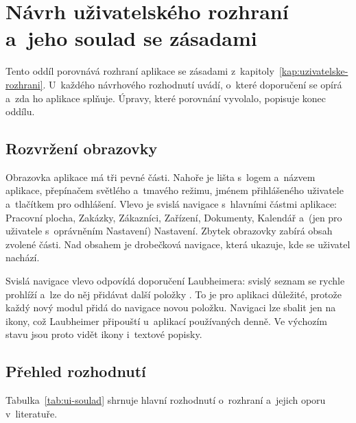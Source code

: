 \section{Návrh uživatelského rozhraní a~jeho soulad se zásadami}\label{sec:ui-soulad}

Tento oddíl porovnává rozhraní aplikace se zásadami z~kapitoly~\ref{kap:uzivatelske-rozhrani}. U~každého návrhového rozhodnutí uvádí, o~které doporučení se opírá a~zda ho aplikace splňuje. Úpravy, které porovnání vyvolalo, popisuje konec oddílu.

\subsection{Rozvržení obrazovky}

Obrazovka aplikace má tři pevné části. Nahoře je lišta s~logem a~názvem aplikace, přepínačem světlého a~tmavého režimu, jménem přihlášeného uživatele a~tlačítkem pro odhlášení. Vlevo je svislá navigace s~hlavními částmi aplikace: Pracovní plocha, Zakázky, Zákazníci, Zařízení, Dokumenty, Kalendář a~(jen pro uživatele s~oprávněním Nastavení) Nastavení. Zbytek obrazovky zabírá obsah zvolené části. Nad obsahem je drobečková navigace, která ukazuje, kde se uživatel nachází.

Svislá navigace vlevo odpovídá doporučení Laubheimera: svislý seznam se rychle prohlíží a~lze do něj přidávat další položky \cite{Laubheimer2021}. To je pro aplikaci důležité, protože každý nový modul přidá do navigace novou položku. Navigaci lze sbalit jen na ikony, což Laubheimer připouští u~aplikací používaných denně. Ve výchozím stavu jsou proto vidět ikony i~textové popisky.

\subsection{Přehled rozhodnutí}

Tabulka~\ref{tab:ui-soulad} shrnuje hlavní rozhodnutí o~rozhraní a~jejich oporu v~literatuře.

